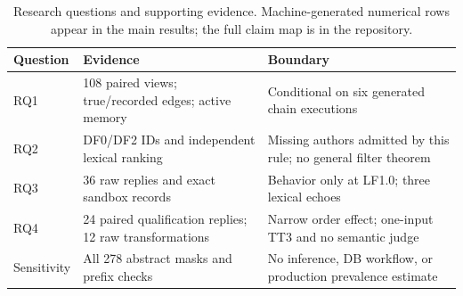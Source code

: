 \documentclass[10pt,letterpaper]{article}
\begin{document}
\begin{table}[h]
\centering\small
\begin{tabular}{p{.13\linewidth}p{.38\linewidth}p{.39\linewidth}}
\toprule
Question & Evidence & Boundary\\
\midrule
RQ1 & 108 paired views; true/recorded edges; active memory & Conditional on six generated chain executions\\
RQ2 & DF0/DF2 IDs and independent lexical ranking & Missing authors admitted by this rule; no general filter theorem\\
RQ3 & 36 raw replies and exact sandbox records & Behavior only at LF1.0; three lexical echoes\\
RQ4 & 24 paired qualification replies; 12 raw transformations & Narrow order effect; one-input TT3 and no semantic judge\\
Sensitivity & All 278 abstract masks and prefix checks & No inference, DB workflow, or production prevalence estimate\\
\bottomrule
\end{tabular}
\caption{Research questions and supporting evidence. Machine-generated numerical rows appear in the main results; the full claim map is in the repository.}
\end{table}
\end{document}
